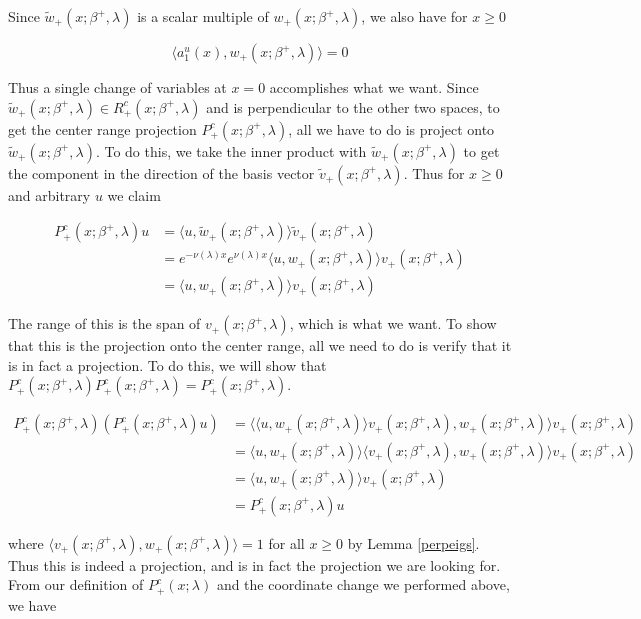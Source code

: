\documentclass[12pt]{article}
\begin{document}
Since $\tilde{w}_+(x; \beta^+, \lambda)$ is a scalar multiple of $w_+(x; \beta^+, \lambda)$, we also have for $x \geq 0$

\[
\langle a^u_1(x), w_+(x; \beta^+, \lambda) \rangle = 0
\]

Thus a single change of variables at $x = 0$ accomplishes what we want. Since $\tilde{w}_+(x; \beta^+, \lambda) \in R^c_+(x; \beta^+, \lambda)$ and is perpendicular to the other two spaces, to get the center range projection $P^c_+(x; \beta^+, \lambda)$, all we have to do is project onto $\tilde{w}_+(x; \beta^+, \lambda)$. To do this, we take the inner product with $\tilde{w}_+(x; \beta^+, \lambda)$ to get the component in the direction of the basis vector $\tilde{v}_+(x; \beta^+, \lambda)$. Thus for $x \geq 0$ and arbitrary $u$ we claim

\begin{align*}
P^c_+(x; \beta^+, \lambda)u &= \langle u, \tilde{w}_+(x; \beta^+, \lambda) \rangle \tilde{v}_+(x; \beta^+, \lambda) \\
&= e^{-\nu(\lambda)x} e^{\nu(\lambda) x }\langle u, w_+(x; \beta^+, \lambda) \rangle v_+(x; \beta^+, \lambda) \\
&= \langle u, w_+(x; \beta^+, \lambda) \rangle v_+(x; \beta^+, \lambda)
\end{align*}

The range of this is the span of $v_+(x; \beta^+, \lambda)$, which is what we want. To show that this is the projection onto the center range, all we need to do is verify that it is in fact a projection. To do this, we will show that $P^c_+(x; \beta^+, \lambda)P^c_+(x; \beta^+, \lambda) = P^c_+(x; \beta^+, \lambda)$.

\begin{align*}
P^c_+(x; \beta^+, \lambda)( P^c_+(x; \beta^+, \lambda) u ) &= \langle \langle u, w_+(x; \beta^+, \lambda) \rangle v_+(x; \beta^+, \lambda), w_+(x; \beta^+, \lambda) \rangle v_+(x; \beta^+, \lambda) \\
&= \langle u, w_+(x; \beta^+, \lambda) \rangle \langle v_+(x; \beta^+, \lambda), w_+(x; \beta^+, \lambda) \rangle v_+(x; \beta^+, \lambda) \\
&= \langle u, w_+(x; \beta^+, \lambda) \rangle v_+(x; \beta^+, \lambda) \\
&= P^c_+(x; \beta^+, \lambda) u 
\end{align*}

where $\langle v_+(x; \beta^+, \lambda), w_+(x; \beta^+, \lambda) \rangle = 1$ for all $x \geq 0$ by Lemma \ref{perpeigs}. Thus this is indeed a projection, and is in fact the projection we are looking for. From our definition of $P^c_+(x; \lambda)$ and the coordinate change we performed above, we have
\end{document}
